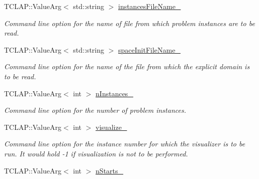 \begin{DoxyCompactItemize}
\item 
T\+C\+L\+A\+P\+::\+Value\+Arg$<$ std\+::string $>$ \hyperlink{structslb_1_1core_1_1commandLine_1_1CommandLine_aae80eb58b58985870f186e80d7b16f0c}{instances\+File\+Name\+\_\+}\hypertarget{structslb_1_1core_1_1commandLine_1_1CommandLine_aae80eb58b58985870f186e80d7b16f0c}{}\label{structslb_1_1core_1_1commandLine_1_1CommandLine_aae80eb58b58985870f186e80d7b16f0c}

\begin{DoxyCompactList}\small\item\em Command line option for the name of file from which problem instances are to be read. \end{DoxyCompactList}\item 
T\+C\+L\+A\+P\+::\+Value\+Arg$<$ std\+::string $>$ \hyperlink{structslb_1_1core_1_1commandLine_1_1CommandLine_a2d5e9932ad4c70e62f1a8f5760665880}{space\+Init\+File\+Name\+\_\+}\hypertarget{structslb_1_1core_1_1commandLine_1_1CommandLine_a2d5e9932ad4c70e62f1a8f5760665880}{}\label{structslb_1_1core_1_1commandLine_1_1CommandLine_a2d5e9932ad4c70e62f1a8f5760665880}

\begin{DoxyCompactList}\small\item\em Command line option for the name of the file from which the explicit domain is to be read. \end{DoxyCompactList}\item 
T\+C\+L\+A\+P\+::\+Value\+Arg$<$ int $>$ \hyperlink{structslb_1_1core_1_1commandLine_1_1CommandLine_a45634f339b37747bcc19ce6c9e35d321}{n\+Instances\+\_\+}\hypertarget{structslb_1_1core_1_1commandLine_1_1CommandLine_a45634f339b37747bcc19ce6c9e35d321}{}\label{structslb_1_1core_1_1commandLine_1_1CommandLine_a45634f339b37747bcc19ce6c9e35d321}

\begin{DoxyCompactList}\small\item\em Command line option for the number of problem instances. \end{DoxyCompactList}\item 
T\+C\+L\+A\+P\+::\+Value\+Arg$<$ int $>$ \hyperlink{structslb_1_1core_1_1commandLine_1_1CommandLine_a4ada16371a5e3052b75b91658613f283}{visualize\+\_\+}\hypertarget{structslb_1_1core_1_1commandLine_1_1CommandLine_a4ada16371a5e3052b75b91658613f283}{}\label{structslb_1_1core_1_1commandLine_1_1CommandLine_a4ada16371a5e3052b75b91658613f283}

\begin{DoxyCompactList}\small\item\em Command line option for the instance number for which the visualizer is to be run. It would hold -\/1 if visualization is not to be performed. \end{DoxyCompactList}\item 
T\+C\+L\+A\+P\+::\+Value\+Arg$<$ int $>$ \hyperlink{structslb_1_1core_1_1commandLine_1_1CommandLine_af848807b96ecf4560989abb9b78bfdf5}{n\+Starts\+\_\+}\hypertarget{structslb_1_1core_1_1commandLine_1_1CommandLine_af848807b96ecf4560989abb9b78bfdf5}{}\label{structslb_1_1core_1_1commandLine_1_1CommandLine_af848807b96ecf4560989abb9b78bfdf5}


\end{DoxyCompactItemize}
